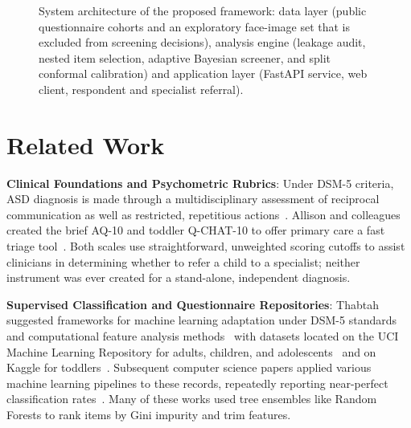 \documentclass[conference]{IEEEtran}
\newcommand{\icScreen}[3]{\begin{scope}[shift={(#1,#2)},scale=#3]

\draw[rounded corners=2pt,fill=black!75,draw=black!85,line width=0.8pt] (-0.62,-0.42) rectangle (0.62,0.42);

\fill[white] (-0.53,-0.33) rectangle (0.53,0.33);

\fill[green!55!black] (-0.3,0.12) circle (0.08); \fill[blue!65!black] (0,0.12) circle (0.08); \fill[red!70!black] (0.3,0.12) circle (0.08);

\draw[black!35,line width=0.7pt] (-0.38,-0.12)--(0.38,-0.12); \draw[black!25,line width=0.7pt] (-0.38,-0.24)--(0.2,-0.24);

\fill[black!70] (-0.1,-0.42) rectangle (0.1,-0.54); \fill[black!70] (-0.3,-0.6) rectangle (0.3,-0.52);

\end{scope}}
\newcommand{\icPerson}[4]{\begin{scope}[shift={(#1,#2)},scale=#3]

\fill[#4] (0,0.3) circle (0.18);

\fill[#4] (-0.34,-0.42) .. controls (-0.34,0.06) and (0.34,0.06) .. (0.34,-0.42) -- cycle;

\end{scope}}
\newcommand{\icDoctor}[3]{\icPerson{#1}{#2}{#3}{red!60!black}\begin{scope}[shift={(#1,#2)},scale=#3]

\fill[white] (-0.04,-0.28) rectangle (0.04,-0.06); \fill[white] (-0.13,-0.19) rectangle (0.13,-0.11);

\end{scope}}
\newcommand{\icServer}[3]{\begin{scope}[shift={(#1,#2)},scale=#3]

\foreach \yy in {0.34,0,-0.34}{\draw[rounded corners=1.5pt,fill=blue!12,draw=blue!60!black,line width=0.8pt] (-0.5,\yy-0.14) rectangle (0.5,\yy+0.14);

\fill[green!55!black] (-0.36,\yy) circle (0.045); \fill[blue!60!black] (-0.22,\yy) circle (0.045); \draw[blue!50!black,line width=0.6pt] (0.02,\yy)--(0.38,\yy);}

\end{scope}}
\begin{document}
\begin{figure}[!t]
{
}

\caption{System architecture of the proposed framework: data layer (public questionnaire cohorts and an exploratory face-image set that is excluded from screening decisions), analysis engine (leakage audit, nested item selection, adaptive Bayesian screener, and split conformal calibration) and application layer (FastAPI service, web client, respondent and specialist referral).}

\label{fig:architecture}

\end{figure}

\section{Related Work}

\noindent\textbf{Clinical Foundations and Psychometric Rubrics}:
Under DSM-5 criteria, ASD diagnosis is made through a multidisciplinary assessment of reciprocal communication as well as restricted, repetitious actions~\cite{american2013diagnostic}. Allison and colleagues created the brief AQ-10 and toddler Q-CHAT-10 to offer primary care a fast triage tool~\cite{allison2012toward}. Both scales use straightforward, unweighted scoring cutoffs to assist clinicians in determining whether to refer a child to a specialist; neither instrument was ever created for a stand-alone, independent diagnosis.

\noindent\textbf{Supervised Classification and Questionnaire Repositories}:
Thabtah suggested frameworks for machine learning adaptation under DSM-5 standards~\cite{thabtah2017autism} and computational feature analysis methods~\cite{thabtah2018qchat} with datasets located on the UCI Machine Learning Repository for adults, children, and adolescents~\cite{uci_asd_adult, uci_asd_child, uci_asd_adolescent} and on Kaggle for toddlers~\cite{kaggle_toddler}. Subsequent computer science papers applied various machine learning pipelines to these records, repeatedly reporting near-perfect classification rates~\cite{thabtah2019machine}. Many of these works used tree ensembles like Random Forests to rank items by Gini impurity and trim features.
\end{document}
